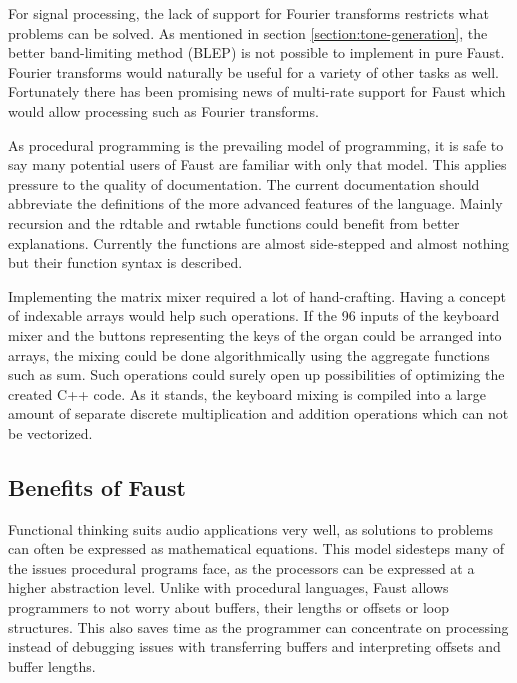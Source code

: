 \documentclass[11pt,a4paper]{article}
\begin{document}
For signal processing, the lack of support for Fourier transforms restricts what problems can be solved. As mentioned in section \ref{section:tone-generation}, the better band-limiting method (BLEP) is not possible to implement in pure Faust. Fourier transforms would naturally be useful for a variety of other tasks as well. Fortunately there has been promising news of multi-rate support for Faust which would allow processing such as Fourier transforms.

As procedural programming is the prevailing model of programming, it is safe to say many potential users of Faust are familiar with only that model. This applies pressure to the quality of documentation. The current documentation should abbreviate the definitions of the more advanced features of the language. Mainly recursion and the rdtable and rwtable functions could benefit from better explanations. Currently the functions are almost side-stepped and almost nothing but their function syntax is described.

Implementing the matrix mixer required a lot of hand-crafting. Having a concept of indexable arrays would help such operations. If the 96 inputs of the keyboard mixer and the buttons representing the keys of the organ could be arranged into arrays, the mixing could be done algorithmically using the aggregate functions such as sum. Such operations could surely open up possibilities of optimizing the created C++ code. As it stands, the keyboard mixing is compiled into a large amount of separate discrete multiplication and addition operations which can not be vectorized.



\subsection{Benefits of Faust}

Functional thinking suits audio applications very well, as solutions to problems can often be expressed as mathematical equations. This model sidesteps many of the issues procedural programs face, as the processors can be expressed at a higher abstraction level. Unlike with procedural languages, Faust allows programmers to not worry about buffers, their lengths or offsets or loop structures. This also saves time as the programmer can concentrate on processing instead of debugging issues with transferring buffers and interpreting offsets and buffer lengths.
\end{document}
